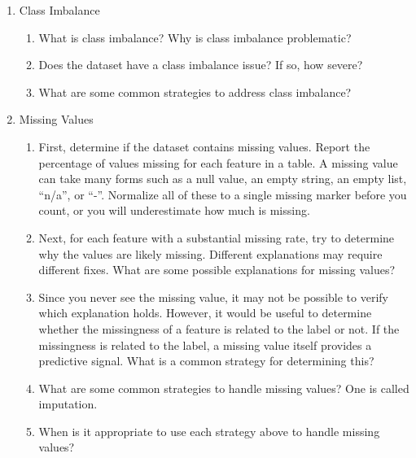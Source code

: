 \documentclass[12pt]{article}
\begin{document}
\begin{enumerate}
difference in feature scales.
\smallskip
\begin{enumerate}
\item What should we do when exploring the distributions of the features?
\item Suppose a feature takes the same value for almost every respondent. Why is
this feature worth finding, and what would you do about it?
\item Suppose two features are highly correlated, such as two Likert questions
that respondents tend to answer the same way. How would you test whether two
features are highly correlated, and why does a highly correlated pair cause
trouble?
\end{enumerate}
\item Class Imbalance
\begin{enumerate}
\item What is class imbalance? Why is class imbalance problematic?
\item Does the dataset have a class imbalance issue? If so, how severe?
\item What are some common strategies to address class imbalance?
\end{enumerate}
\item Missing Values
\begin{enumerate}
\item First, determine if the dataset contains missing values. Report the
percentage of values missing for each feature in a table. A missing value can take
many forms such as a null value, an empty string, an empty list, ``n/a'', or ``-''.
Normalize all of these to a single missing marker before you count, or you will
underestimate how much is missing.
\bigskip
\item Next, for each feature with a substantial missing rate, try to determine why
the values are likely missing. Different explanations may require different fixes.
What are some possible explanations for missing values?
\bigskip
\item
Since you never see the missing value, it may not be possible to verify which
explanation holds. However, it would be useful to determine whether the missingness
of a feature is related to the label or not. If the missingness is related to the
label, a missing value itself provides a predictive signal. What is a common
strategy for determining this?
\item What are some common strategies to handle missing values? One is called
imputation.
\item When is it appropriate to use each strategy above to handle missing values?

\end{enumerate}
\end{enumerate}
\end{document}
